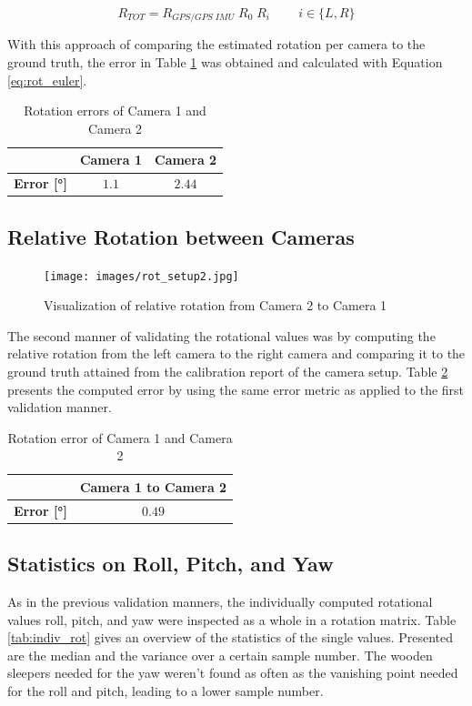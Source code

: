 \begin{equation}
R_{TOT} = R_{GPS/ GPS \;IMU} \; R_0  \; R_i \; \; \; \; \; \; \; \; i \in \{ L, R\}
\label{eq:rot}
\end{equation}

With this approach of comparing the estimated rotation per camera to the ground truth, the error in Table \ref{tab:rot1} was obtained and calculated with Equation \ref{eq:rot_euler}.

\begin{table}[h!]
\centering
\begin{tabular}{ccc}
  & \textbf{Camera 1} & \textbf{Camera 2} \\
\midrule
\textbf{Error [°]} & $1.1$ & $2.44$ \\
\bottomrule
\end{tabular}
\caption{Rotation errors of Camera 1 and Camera 2}
\label{tab:rot1}
\end{table}







\newpage
\subsection{Relative Rotation between Cameras}
\begin{figure}[h!]
   \centering
   \texttt{[image: images/rot\_setup2.jpg]}
   \caption{Visualization of relative rotation from Camera 2 to Camera 1}
   \label{pics:rotsetup2}
\end{figure}
The second manner of validating the rotational values was by computing the relative rotation from the left camera to the right camera and comparing it to the ground truth attained from the calibration report of the camera setup. Table \ref{tab:rot2} presents the computed error by using the same error metric as applied to the first validation manner.

\begin{table}[h!]
\centering
\begin{tabular}{cc}
  & \textbf{Camera 1 to Camera 2} \\
\midrule
\textbf{Error [°]} & $0.49$ \\
\bottomrule
\end{tabular}
\caption{Rotation error of Camera 1 and Camera 2}
\label{tab:rot2}
\end{table}


\subsection{Statistics on Roll, Pitch, and Yaw}
As in the previous validation manners, the individually computed rotational values roll, pitch, and yaw were inspected as a whole in a rotation matrix. Table \ref{tab:indiv_rot} gives an overview of the statistics of the single values. Presented are the median and the variance over a certain sample number. The wooden sleepers needed for the yaw weren't found as often as the vanishing point needed for the roll and pitch, leading to a lower sample number.


